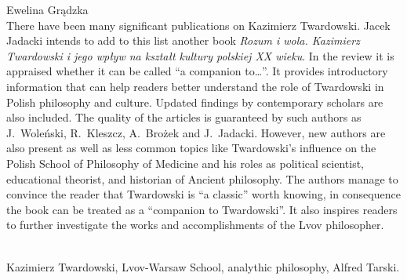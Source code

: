 \begin{newrevengenv}{Ewelina Grądzka}
\vspace{15mm}%
{}\\
{
There have been many significant publications on Kazimierz Twardowski. Jacek Jadacki intends to add to this list another book \textit{Rozum i wola. Kazimierz Twardowski i jego wpływ na kształt kultury polskiej XX wieku}. In the review it is appraised whether it can be called ``a companion to…''. It provides introductory information that can help readers better understand the role of Twardowski in Polish philosophy and culture. Updated findings by contemporary scholars are also included. The quality of the articles is guaranteed by such authors as J.~Woleński, R.~Kleszcz, A.~Brożek and J.~Jadacki. However, new authors are also present as well as less common topics like Twardowski's influence on the Polish School of Philosophy of Medicine and his roles as political scientist, educational theorist, and historian of Ancient philosophy. The authors manage to convince the reader that Twardowski is ``a classic'' worth knowing, in consequence the book can be treated as a ``companion to Twardowski''. It also inspires readers to further investigate the works and accomplishments of the Lvov philosopher.    
}\par%
\vspace{2mm}%
{}\\
{Kazimierz Twardowski, Lvov-Warsaw School, analythic philosophy, Alfred Tarski.}%



\end{newrevengenv}
